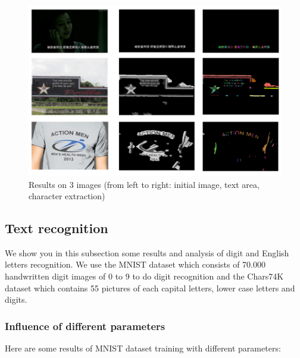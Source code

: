 \documentclass[paper=a4, french, 11pt]{scrartcl}
\begin{document}
\begin{figure}[h]
\begin{center}
   \includegraphics[width=1.0\linewidth]{results.png}
\end{center}
\vspace{-3ex}
\caption{Results on 3 images (from left to right: initial image, text area, character extraction)}
\label{fig:result}
\end{figure}

\subsection{Text recognition} \mbox{} \vspace{-0.5cm}

We show you in this subsection some results and analysis of digit and English letters recognition. We use the MNIST dataset which consists of 70.000 handwritten digit images of 0 to 9 to do digit recognition and the Chars74K dataset which contains 55 pictures of each capital letters, lower case letters and digits.

\subsubsection{Influence of different parameters} \mbox{} \vspace{-0.5cm}

Here are some results of MNIST dataset training with different parameters:
\end{document}
